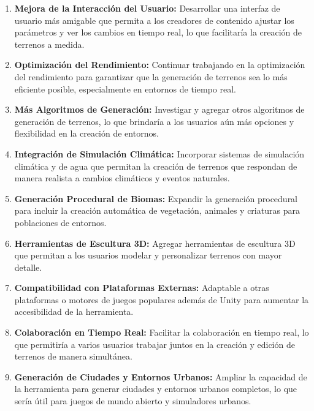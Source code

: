 \begin{enumerate}
    \item \textbf{Mejora de la Interacción del Usuario:} Desarrollar una interfaz de usuario más amigable que permita a los creadores de contenido ajustar los parámetros y ver los cambios en tiempo real, lo que facilitaría la creación de terrenos a medida.
    
    \item \textbf{Optimización del Rendimiento:} Continuar trabajando en la optimización del rendimiento para garantizar que la generación de terrenos sea lo más eficiente posible, especialmente en entornos de tiempo real.
    
    \item \textbf{Más Algoritmos de Generación:} Investigar y agregar otros algoritmos de generación de terrenos, lo que brindaría a los usuarios aún más opciones y flexibilidad en la creación de entornos.
    
    \item \textbf{Integración de Simulación Climática:} Incorporar sistemas de simulación climática y de agua que permitan la creación de terrenos que respondan de manera realista a cambios climáticos y eventos naturales.
    
    \item \textbf{Generación Procedural de Biomas:} Expandir la generación procedural para incluir la creación automática de vegetación, animales y criaturas para poblaciones de entornos.
    
    \item \textbf{Herramientas de Escultura 3D:} Agregar herramientas de escultura 3D que permitan a los usuarios modelar y personalizar terrenos con mayor detalle.
    
    \item \textbf{Compatibilidad con Plataformas Externas:} Adaptable a otras plataformas o motores de juegos populares además de Unity para aumentar la accesibilidad de la herramienta.
    
    \item \textbf{Colaboración en Tiempo Real:} Facilitar la colaboración en tiempo real, lo que permitiría a varios usuarios trabajar juntos en la creación y edición de terrenos de manera simultánea.
    
    \item \textbf{Generación de Ciudades y Entornos Urbanos:} Ampliar la capacidad de la herramienta para generar ciudades y entornos urbanos completos, lo que sería útil para juegos de mundo abierto y simuladores urbanos.
    

\end{enumerate}
